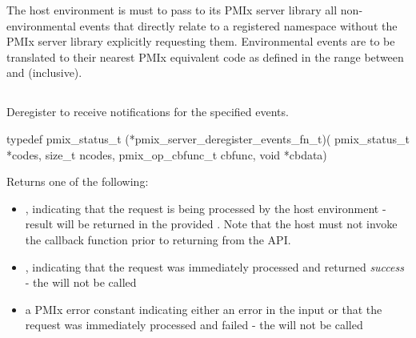 \adviceimplend

\advicermstart
The host environment is must to pass to its \ac{PMIx} server library all non-environmental events that directly relate to a registered namespace without the \ac{PMIx} server library explicitly requesting them. Environmental events are to be translated to their nearest \ac{PMIx} equivalent code as defined in the range between  and  (inclusive).
\advicermend


\subsection{}

\summary

Deregister to receive notifications for the specified events.

\format

\cspecificstart
\begin{codepar}
 typedef pmix_status_t (*pmix_server_deregister_events_fn_t)(
                              pmix_status_t *codes,
                              size_t ncodes,
                              pmix_op_cbfunc_t cbfunc,
                              void *cbdata)
\end{codepar}
\cspecificend

\begin{arglist}
\end{arglist}

Returns one of the following:

\begin{itemize}
    \item {}, indicating that the request is being processed by the host environment - result will be returned in the provided . Note that the host must not invoke the callback function prior to returning from the \ac{API}.
    \item {}, indicating that the request was immediately processed and returned \textit{success} - the  will not be called
    \item a PMIx error constant indicating either an error in the input or that the request was immediately processed and failed - the  will not be called
\end{itemize}

